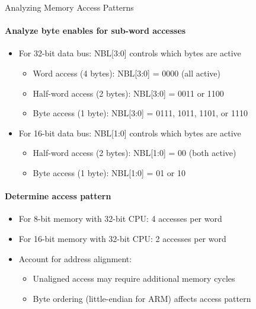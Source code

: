 \begin{KR}{Analyzing Memory Access Patterns}
\paragraph{Analyze byte enables for sub-word accesses}
\begin{itemize}
    \item For 32-bit data bus: NBL[3:0] controls which bytes are active
    \begin{itemize}
        \item Word access (4 bytes): NBL[3:0] = 0000 (all active)
        \item Half-word access (2 bytes): NBL[3:0] = 0011 or 1100
        \item Byte access (1 byte): NBL[3:0] = 0111, 1011, 1101, or 1110
    \end{itemize}
    \item For 16-bit data bus: NBL[1:0] controls which bytes are active
    \begin{itemize}
        \item Half-word access (2 bytes): NBL[1:0] = 00 (both active)
        \item Byte access (1 byte): NBL[1:0] = 01 or 10
    \end{itemize}
\end{itemize}

\paragraph{Determine access pattern}
\begin{itemize}
    \item For 8-bit memory with 32-bit CPU: 4 accesses per word
    \item For 16-bit memory with 32-bit CPU: 2 accesses per word
    \item Account for address alignment:
    \begin{itemize}
        \item Unaligned access may require additional memory cycles
        \item Byte ordering (little-endian for ARM) affects access pattern
    \end{itemize}
\end{itemize}
\end{KR}

